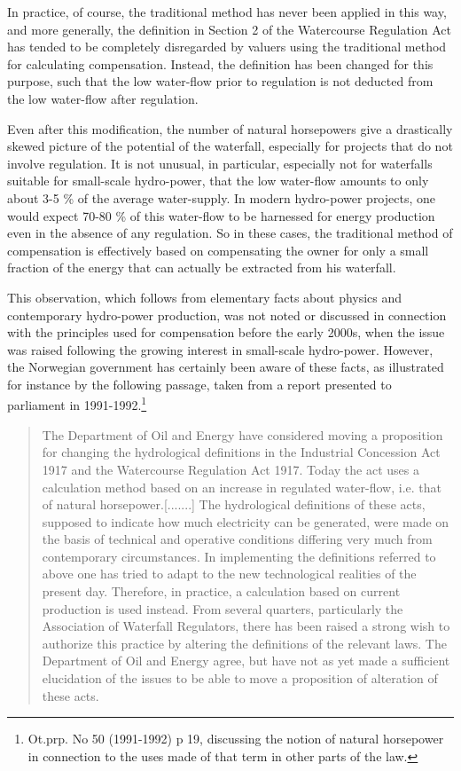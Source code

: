 In practice, of course, the traditional method has never been applied in this way, and more generally, the definition in Section 2 of the Watercourse Regulation Act has tended to be completely disregarded by valuers using the traditional method for calculating compensation. Instead, the definition has been changed for this purpose, such that the low water-flow prior to regulation is not deducted from the low water-flow after regulation.

Even after this modification, the number of natural horsepowers give a drastically skewed picture of the potential of the waterfall, especially for projects that do not involve regulation. It is not unusual, in particular, especially not for waterfalls suitable for small-scale hydro-power, that the low water-flow amounts to only about 3-5 \% of the average water-supply. In modern hydro-power projects, one would expect 70-80 \% of this water-flow to be harnessed for energy production even in the absence of any regulation. So in these cases, the traditional method of compensation is effectively based on compensating the owner for only a small fraction of the energy that can actually be extracted from his waterfall.

This observation, which follows from elementary facts about physics and contemporary hydro-power production, was not noted or discussed in connection with the principles used for compensation before the early 2000s, when the issue was raised following the growing interest in small-scale hydro-power. However, the Norwegian government has certainly been aware of these facts, as illustrated for instance by the following passage, taken from a report presented to parliament in 1991-1992.\footnote{Ot.prp. No 50 (1991-1992) p 19, discussing the notion of natural horsepower in connection to the uses made of that term in other parts of the law.}

\begin{quote}
The Department of Oil and Energy have considered moving a proposition for changing the hydrological definitions in the Industrial Concession Act 1917 and the Watercourse Regulation Act 1917. Today the act uses a calculation method based on an increase in regulated water-flow, i.e. that of natural horsepower.[.......] The hydrological definitions of these acts, supposed to indicate how much electricity can be generated, were made on the basis of technical and operative conditions differing very much from contemporary circumstances. In implementing the definitions referred to above one has tried to adapt to the new technological realities of the present day. Therefore, in practice, a calculation based on current production is used instead. From several quarters, particularly the Association of Waterfall Regulators, there has been raised a strong wish to authorize this practice by altering the definitions of the relevant laws. The Department of Oil and Energy agree, but have not as yet made a sufficient elucidation of the issues to be able to move a proposition of alteration of these acts.
\end{quote}

